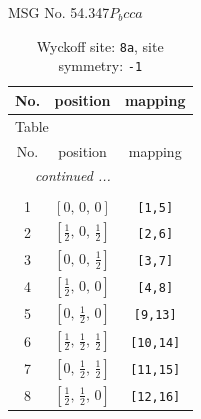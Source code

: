 \documentclass[fleqn,8pt]{jsarticle}
\begin{document}
\setcounter{MaxMatrixCols}{32}

\renewcommand{\tablename}{Table~}
\renewcommand{\figurename}{Figure~}
\begin{center}
\LARGE
MSG No. 54.347\quad$P_{b}cca$
\end{center}
\renewcommand{\arraystretch}{1.2}
\begin{longtable}{ccc}
\caption{Wyckoff site: {\tt 8a}, site symmetry: {\tt -1}}
 \\
 \hline \hline
No. & position & mapping \\ \hline \endfirsthead

\multicolumn{2}{l}{\tablename\ \thetable{}} \\
 \hline \hline
No. & position & mapping \\ \hline \endhead

 \hline \hline
\multicolumn{2}{r}{\footnotesize\it continued ...} \\ \endfoot

 \hline \hline
\multicolumn{2}{r}{} \\ \endlastfoot

1 & $\left[ 0,\, 0,\, 0 \right]$ & {\tt [1,5]} \\ \hline
2 & $\left[ \frac{1}{2},\, 0,\, \frac{1}{2} \right]$ & {\tt [2,6]} \\ \hline
3 & $\left[ 0,\, 0,\, \frac{1}{2} \right]$ & {\tt [3,7]} \\ \hline
4 & $\left[ \frac{1}{2},\, 0,\, 0 \right]$ & {\tt [4,8]} \\ \hline
5 & $\left[ 0,\, \frac{1}{2},\, 0 \right]$ & {\tt [9,13]} \\ \hline
6 & $\left[ \frac{1}{2},\, \frac{1}{2},\, \frac{1}{2} \right]$ & {\tt [10,14]} \\ \hline
7 & $\left[ 0,\, \frac{1}{2},\, \frac{1}{2} \right]$ & {\tt [11,15]} \\ \hline
8 & $\left[ \frac{1}{2},\, \frac{1}{2},\, 0 \right]$ & {\tt [12,16]} \\
\end{longtable}
\renewcommand{\arraystretch}{1.2}
\end{document}
